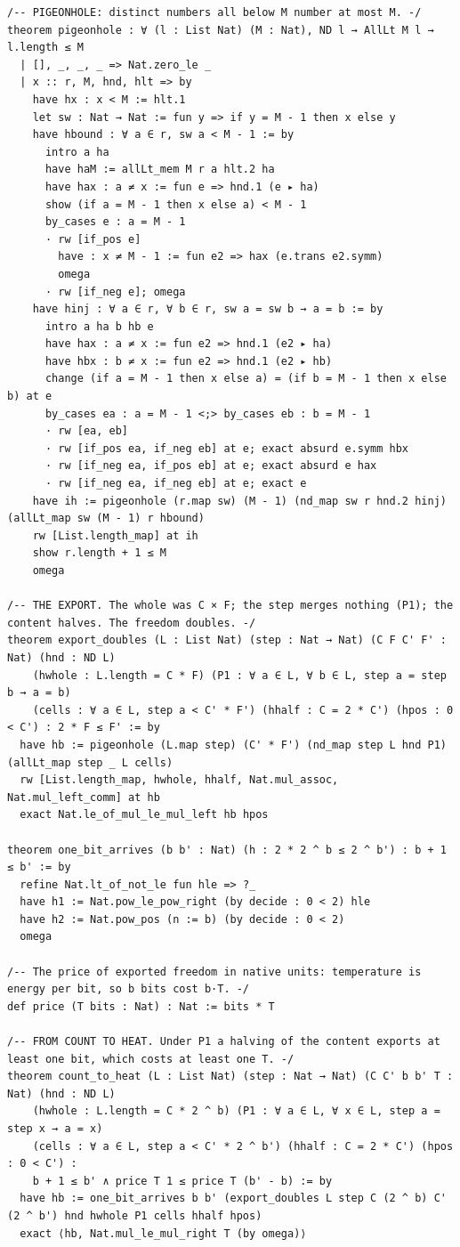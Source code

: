 \documentclass[10pt,twocolumn]{article}
\begin{document}
\begin{Verbatim}
/-- PIGEONHOLE: distinct numbers all below M number at most M. -/
theorem pigeonhole : ∀ (l : List Nat) (M : Nat), ND l → AllLt M l → l.length ≤ M
  | [], _, _, _ => Nat.zero_le _
  | x :: r, M, hnd, hlt => by
    have hx : x < M := hlt.1
    let sw : Nat → Nat := fun y => if y = M - 1 then x else y
    have hbound : ∀ a ∈ r, sw a < M - 1 := by
      intro a ha
      have haM := allLt_mem M r a hlt.2 ha
      have hax : a ≠ x := fun e => hnd.1 (e ▸ ha)
      show (if a = M - 1 then x else a) < M - 1
      by_cases e : a = M - 1
      · rw [if_pos e]
        have : x ≠ M - 1 := fun e2 => hax (e.trans e2.symm)
        omega
      · rw [if_neg e]; omega
    have hinj : ∀ a ∈ r, ∀ b ∈ r, sw a = sw b → a = b := by
      intro a ha b hb e
      have hax : a ≠ x := fun e2 => hnd.1 (e2 ▸ ha)
      have hbx : b ≠ x := fun e2 => hnd.1 (e2 ▸ hb)
      change (if a = M - 1 then x else a) = (if b = M - 1 then x else b) at e
      by_cases ea : a = M - 1 <;> by_cases eb : b = M - 1
      · rw [ea, eb]
      · rw [if_pos ea, if_neg eb] at e; exact absurd e.symm hbx
      · rw [if_neg ea, if_pos eb] at e; exact absurd e hax
      · rw [if_neg ea, if_neg eb] at e; exact e
    have ih := pigeonhole (r.map sw) (M - 1) (nd_map sw r hnd.2 hinj) (allLt_map sw (M - 1) r hbound)
    rw [List.length_map] at ih
    show r.length + 1 ≤ M
    omega

/-- THE EXPORT. The whole was C × F; the step merges nothing (P1); the content halves. The freedom doubles. -/
theorem export_doubles (L : List Nat) (step : Nat → Nat) (C F C' F' : Nat) (hnd : ND L)
    (hwhole : L.length = C * F) (P1 : ∀ a ∈ L, ∀ b ∈ L, step a = step b → a = b)
    (cells : ∀ a ∈ L, step a < C' * F') (hhalf : C = 2 * C') (hpos : 0 < C') : 2 * F ≤ F' := by
  have hb := pigeonhole (L.map step) (C' * F') (nd_map step L hnd P1) (allLt_map step _ L cells)
  rw [List.length_map, hwhole, hhalf, Nat.mul_assoc, Nat.mul_left_comm] at hb
  exact Nat.le_of_mul_le_mul_left hb hpos

theorem one_bit_arrives (b b' : Nat) (h : 2 * 2 ^ b ≤ 2 ^ b') : b + 1 ≤ b' := by
  refine Nat.lt_of_not_le fun hle => ?_
  have h1 := Nat.pow_le_pow_right (by decide : 0 < 2) hle
  have h2 := Nat.pow_pos (n := b) (by decide : 0 < 2)
  omega

/-- The price of exported freedom in native units: temperature is energy per bit, so b bits cost b·T. -/
def price (T bits : Nat) : Nat := bits * T

/-- FROM COUNT TO HEAT. Under P1 a halving of the content exports at least one bit, which costs at least one T. -/
theorem count_to_heat (L : List Nat) (step : Nat → Nat) (C C' b b' T : Nat) (hnd : ND L)
    (hwhole : L.length = C * 2 ^ b) (P1 : ∀ a ∈ L, ∀ x ∈ L, step a = step x → a = x)
    (cells : ∀ a ∈ L, step a < C' * 2 ^ b') (hhalf : C = 2 * C') (hpos : 0 < C') :
    b + 1 ≤ b' ∧ price T 1 ≤ price T (b' - b) := by
  have hb := one_bit_arrives b b' (export_doubles L step C (2 ^ b) C' (2 ^ b') hnd hwhole P1 cells hhalf hpos)
  exact ⟨hb, Nat.mul_le_mul_right T (by omega)⟩


\end{Verbatim}
\end{document}
